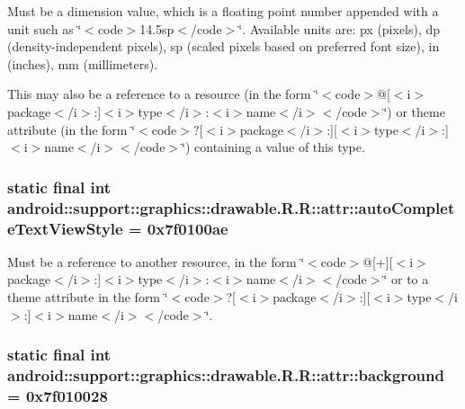Must be a dimension value, which is a floating point number appended with a unit such as \char`\"{}$<$code$>$14.5sp$<$/code$>$\char`\"{}. Available units are: px (pixels), dp (density-independent pixels), sp (scaled pixels based on preferred font size), in (inches), mm (millimeters). 

This may also be a reference to a resource (in the form \char`\"{}$<$code$>$@\mbox{[}$<$i$>$package$<$/i$>$:\mbox{]}$<$i$>$type$<$/i$>$:$<$i$>$name$<$/i$>$$<$/code$>$\char`\"{}) or theme attribute (in the form \char`\"{}$<$code$>$?\mbox{[}$<$i$>$package$<$/i$>$:\mbox{]}\mbox{[}$<$i$>$type$<$/i$>$:\mbox{]}$<$i$>$name$<$/i$>$$<$/code$>$\char`\"{}) containing a value of this type. \hypertarget{classandroid_1_1support_1_1graphics_1_1drawable_1_1_r_1_1attr_0b27365290046197e7ff3c5938e76555}{
\subsubsection[{autoCompleteTextViewStyle}]{\setlength{\rightskip}{0pt plus 5cm}static final int android::support::graphics::drawable.R.R::attr::autoCompleteTextViewStyle = 0x7f0100ae}}
\label{classandroid_1_1support_1_1graphics_1_1drawable_1_1_r_1_1attr_0b27365290046197e7ff3c5938e76555}


Must be a reference to another resource, in the form \char`\"{}$<$code$>$@\mbox{[}+\mbox{]}\mbox{[}$<$i$>$package$<$/i$>$:\mbox{]}$<$i$>$type$<$/i$>$:$<$i$>$name$<$/i$>$$<$/code$>$\char`\"{} or to a theme attribute in the form \char`\"{}$<$code$>$?\mbox{[}$<$i$>$package$<$/i$>$:\mbox{]}\mbox{[}$<$i$>$type$<$/i$>$:\mbox{]}$<$i$>$name$<$/i$>$$<$/code$>$\char`\"{}. \hypertarget{classandroid_1_1support_1_1graphics_1_1drawable_1_1_r_1_1attr_705deef302c54fcc5a45cc95a93271de}{
\subsubsection[{background}]{\setlength{\rightskip}{0pt plus 5cm}static final int android::support::graphics::drawable.R.R::attr::background = 0x7f010028}}
\label{classandroid_1_1support_1_1graphics_1_1drawable_1_1_r_1_1attr_705deef302c54fcc5a45cc95a93271de}


